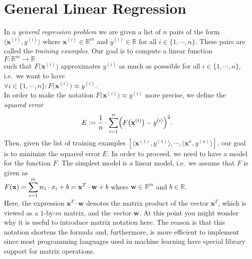 \section{General Linear Regression}
In a \emph{general regression problem} we are given a list of $n$ pairs of the form $\langle\mathbf{x}^{(i)}, y^{(i)} \rangle$ 
where $\mathbf{x}^{(i)} \in \mathbb{R}^m$ and $y^{(i)} \in \mathbb{R}$ for all $i \in \{1,\cdots,n\}$.  These pairs are called the \emph{training examples}.
Our goal is to compute a linear function 
\\[0.2cm]
\hspace*{1.3cm}
$F:\mathbb{R}^m \rightarrow \mathbb{R}$
\\[0.2cm]  
such that $F\bigl(\mathbf{x}^{(i)}\bigr)$ approximates  $y^{(i)}$ as much as posssible
for all $i\in\{1,\cdots,n\}$, i.e.~we want to have
\\[0.2cm]
\hspace*{1.3cm}
$\forall i\in\{1,\cdots,n\}:F\bigl(\mathbf{x}^{(i)}\bigr) \approx y^{(i)}$.
\\[0.2cm]
In order to make the notation $F\bigl(\mathbf{x}^{(i)}\bigr) \approx y^{(i)}$ more precise, we
define the \emph{squared error} 
\begin{equation}
  \label{eq:squared-error-1}
  E := \frac{1}{n} \cdot \sum\limits_{i=1}^n \Bigl(F\bigl(\mathbf{x}^{(i)}\bigr) - y^{(i)}\Bigr)^2. 
\end{equation}
Then, given the list of training examples $[\langle \mathbf{x}^{(1)}, y^{(1)} \rangle, \cdots, \langle
\mathbf{x}^{n}, y^{(n)} \rangle]$, our goal is to minimize the squared error $E$.  
In order to proceed, we need to have a model for the function $F$.  The simplest model is a linear
model, i.e.~we assume that $F$ is given as 
\\[0.2cm]
\hspace*{1.3cm}
$\displaystyle F(\mathbf{x}) = \sum\limits_{i=1}^m w_i \cdot x_i + b = \mathbf{x}^T \cdot \mathbf{w} + b$ \quad where $\mathbf{w} \in \mathbb{R}^m$ and $b\in\mathbb{R}$.
\\[0.2cm]
Here, the expression $\mathbf{x}^T \cdot \mathbf{w}$ denotes the matrix product of the vector
$\mathbf{x}^T$, which is viewed as a $1$-by-$m$ matrix, and the vector $\mathbf{w}$.
At this point you might wonder why it is useful to introduce matrix notation here.  The reason is
that this notation shortens the formula and, furthermore, is more efficient to implement since most
programming languages used in machine learning have special library support for matrix operations.


